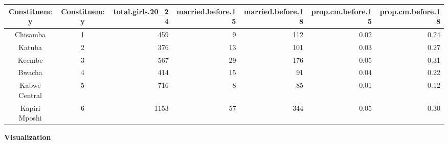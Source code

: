 \documentclass[
]{article}
\begin{document}
\begin{table}[!t]
\fontsize{12.0pt}{14.4pt}\selectfont
\begin{tabular*}{\linewidth}{@{\extracolsep{\fill}}ccrrrrr}
\toprule
Constituency & Constituency & total.girls.20\_24 & married.before.15 & married.before.18 & prop.cm.before.15 & prop.cm.before.18 \\ 
\midrule\addlinespace[2.5pt]
Chisamba & 1 & 459 & 9 & 112 & 0.02 & 0.24 \\ 
Katuba & 2 & 376 & 13 & 101 & 0.03 & 0.27 \\ 
Keembe & 3 & 567 & 29 & 176 & 0.05 & 0.31 \\ 
Bwacha & 4 & 414 & 15 & 91 & 0.04 & 0.22 \\ 
Kabwe Central & 5 & 716 & 8 & 85 & 0.01 & 0.12 \\ 
Kapiri Mposhi & 6 & 1153 & 57 & 344 & 0.05 & 0.30 \\ 
\bottomrule
\end{tabular*}
\end{table}

\textbf{Visualization}
\end{document}
